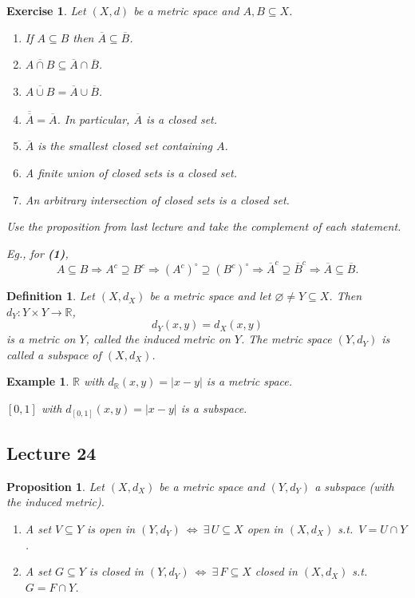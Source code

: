 \documentclass[12pt]{article}
\newtheorem{proposition}{Proposition}
\newtheorem{definition}{Definition}
\newtheorem{example}{Example}
\newtheorem{exercise}{Exercise}
\begin{document}
\begin{exercise}
Let $(X,d)$ be a metric space and $A,B\subseteq X$.
\begin{enumerate}[label=\textbf{(\arabic*)}]
  \item If $A\subseteq B$ then $\overline{A}\subseteq \overline{B}$.
  \item $\overline{A\cap B}\subseteq \overline{A}\cap\overline{B}$.
  \item $\overline{A\cup B}=\overline{A}\cup\overline{B}$.
  \item $\overline{\overline{A}}=\overline{A}$. In particular,
  $\overline{A}$ is a closed set.
  \item $\overline{A}$ is the smallest closed set containing $A$.
  \item A finite union of closed sets is a closed set.
  \item An arbitrary intersection of closed sets is a closed set.
\end{enumerate}

Use the proposition from last lecture and take the complement of each statement.

Eg., for \textbf{(1)},
\[
A\subseteq B \Rightarrow A^c\supseteq B^c \Rightarrow (A^c)^\circ\supseteq (B^c)^\circ
\Rightarrow \overline{A}^c\supseteq \overline{B}^c \Rightarrow \overline{A}\subseteq \overline{B}.
\]
\end{exercise}

\begin{definition}
Let $(X,d_X)$ be a metric space and let $\varnothing\neq Y\subseteq X$. Then
$d_Y:Y\times Y\to\mathbb{R}$,
\[
d_Y(x,y)=d_X(x,y)
\]
is a metric on $Y$, called the induced metric on $Y$. The metric space
$(Y,d_Y)$ is called a subspace of $(X,d_X)$.
\end{definition}

\begin{example}
$\mathbb{R}$ with $d_{\mathbb{R}}(x,y)=|x-y|$ is a metric space.

$[0,1]$ with $d_{[0,1]}(x,y)=|x-y|$ is a subspace.
\end{example}

\subsection*{Lecture 24}

\begin{proposition}
Let $(X,d_X)$ be a metric space and $(Y,d_Y)$ a subspace (with the induced
metric).
\begin{enumerate}[label=\textbf{(\arabic*)}]
  \item A set $V\subseteq Y$ is open in $(Y,d_Y)\ \Leftrightarrow\ \exists\, U\subseteq X$
  open in $(X,d_X)$ s.t.\ $V=U\cap Y$.
  \item A set $G\subseteq Y$ is closed in $(Y,d_Y)\ \Leftrightarrow\ \exists\, F\subseteq X$
  closed in $(X,d_X)$ s.t.\ $G=F\cap Y$.
\end{enumerate}
\end{proposition}
\end{document}
